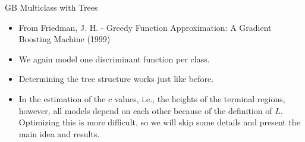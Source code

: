 \documentclass[11pt,compress,t,notes=noshow, xcolor=table]{beamer}
\begin{document}


\begin{vbframe}{GB Multiclass with Trees}

\begin{itemize}
  \item From Friedman, J. H. - Greedy Function Approximation: A Gradient Boosting Machine (1999)
  \item We again model one discriminant function per class.    
  \item Determining the tree structure works just like before.
\item In the estimation of the $c$ values, i.e., the heights of the terminal regions, however, all models depend on each other because of the definition
of $L$. Optimizing this is more difficult, so we will skip some details and present the main idea and results.
\end{itemize}

\framebreak







\end{vbframe}
\end{document}
